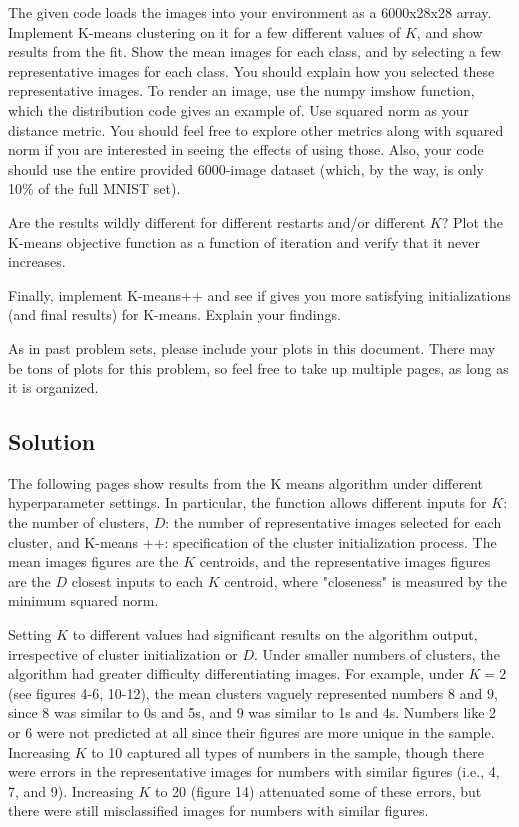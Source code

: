 \documentclass[submit]{harvardml}
\begin{document}
\begin{problem}
The given code loads the images into your environment as a 6000x28x28 array.
Implement K-means clustering on it for a few different values of $K$, and show
results from the fit. Show the mean images for each class, and by selecting a
few representative images for each class. You should explain how you selected
these representative images. To render an image, use the numpy imshow function,
which the distribution code gives an example of. Use squared norm as your
distance metric. You should feel free to explore other metrics along with
squared norm if you are interested in seeing the effects of using those. Also,
your code should use the entire provided 6000-image dataset (which, by the way,
is only 10\% of the full MNIST set).

Are the results wildly different for different restarts and/or different $K$?
Plot the K-means objective function as a function of iteration and verify that
it never increases.

Finally, implement K-means++ and see if gives you more satisfying
initializations (and final results) for K-means. Explain your findings.

As in past problem sets, please include your plots in this document. There may
be tons of plots for this problem, so feel free to take up multiple pages, as
long as it is organized.
\end{problem}

\subsection*{Solution}

The following pages show results from the K means algorithm under different hyperparameter settings. In particular, the function allows different inputs for $K$: the number of clusters, $D$: the number of representative images selected for each cluster, and K-means ++: specification of the cluster initialization process. The mean images figures are the $K$ centroids, and the representative images figures are the $D$ closest inputs to each $K$ centroid, where "closeness" is measured by the minimum squared norm. 

Setting $K$ to different values had significant results on the algorithm output, irrespective of cluster initialization or $D$. Under smaller numbers of clusters, the algorithm had greater difficulty differentiating images. For example, under $K=2$ (see figures 4-6, 10-12), the mean clusters vaguely represented numbers $8$ and $9$, since 8 was similar to 0s and 5s, and 9 was similar to 1s and 4s. Numbers like 2 or 6 were not predicted at all since their figures are more unique in the sample. Increasing $K$ to 10 captured all types of numbers in the sample, though there were errors in the representative images for numbers with similar figures (i.e., 4, 7, and 9). Increasing $K$ to 20 (figure 14) attenuated some of these errors, but there were still misclassified images for numbers with similar figures.
\end{document}
